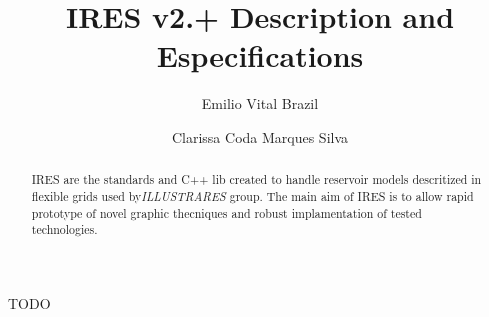 \documentclass[letterpaper,10pt,final]{article}
\title{IRES v2.+ Description and Especifications}
\author{Emilio Vital Brazil \and Clarissa Coda Marques Silva}
\begin{document}
\maketitle

  \begin{abstract}
      IRES are the standards and C++ lib created to handle reservoir models descritized in flexible grids used by\emph{ILLUSTRARES} group.
      The main aim of IRES is to allow rapid prototype of novel graphic thecniques and robust implamentation of tested technologies.
  \end{abstract}
  
TODO
\end{document}
